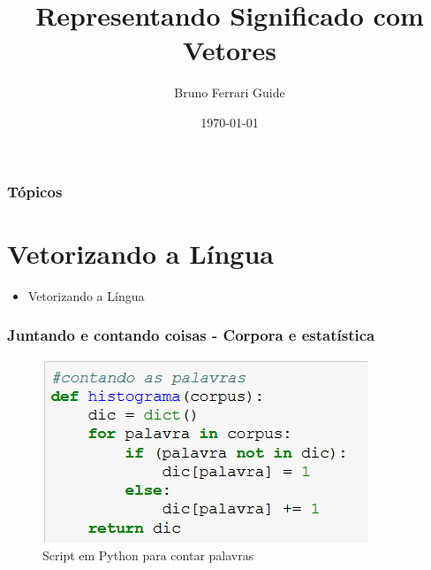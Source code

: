 \documentclass{beamer}
\title[ENAPOL 2018 ]{Representando Significado com Vetores} %
\author{Bruno Ferrari Guide} %
\institute[USP] %
{Orientador: Marcos Lopes\\
Universidade de São Paulo \\ %
\medskip
\textit{bruno.guide@usp.br} %
}
\date{\today} %
\begin{document}
\begin{frame}
\titlepage %
\end{frame}

\begin{frame}
\frametitle{Tópicos} %
\tableofcontents %
\end{frame}


\section{Vetorizando a Língua} %


\begin{frame}
\begin{itemize}
    \item \Large{Vetorizando a Língua}

\end{itemize}

\end{frame}


\begin{frame}
\frametitle{Juntando e contando coisas - Corpora e estatística}
\begin{figure}
	\centering
	\includegraphics[width=0.7\linewidth]{Contando}
	\caption{Script em Python para contar palavras}
	\label{fig:contando}
\end{figure}

\end{frame}
\end{document}
